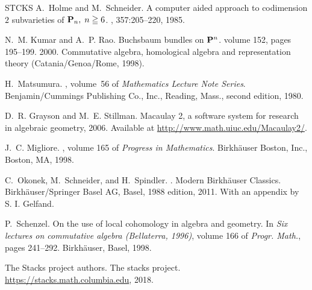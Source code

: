 \documentclass[11pt,a4paper]{amsart}
\theoremstyle{plain}
\theoremstyle{definition}
\begin{document}
\begin{thebibliography}{STCKS}
A.~Holme and M.~Schneider.
\newblock A computer aided approach to codimension {$2$} subvarieties of {${\bf
  P}_n,\;n \geqq 6$}.
, 357:205--220, 1985.

N.~M. Kumar and A.~P. Rao.
\newblock Buchsbaum bundles on {$\bold P^n$}.
\newblock volume 152, pages 195--199. 2000.
\newblock Commutative algebra, homological algebra and representation theory
  (Catania/Genoa/Rome, 1998).

H.~Matsumura.
, volume~56 of {\em Mathematics Lecture Note
  Series}.
\newblock Benjamin/Cummings Publishing Co., Inc., Reading, Mass., second
  edition, 1980.

D.~R. Grayson and M.~E. Stillman.
\newblock Macaulay 2, a software system for research in algebraic geometry,
  2006.
\newblock Available at \url{http://www.math.uiuc.edu/Macaulay2/}.

J.~C. Migliore.
, volume
  165 of {\em Progress in Mathematics}.
\newblock Birkh\"{a}user Boston, Inc., Boston, MA, 1998.

C.~Okonek, M.~Schneider, and H.~Spindler.
.
\newblock Modern Birkh\"{a}user Classics. Birkh\"{a}user/Springer Basel AG,
  Basel, 1988 edition, 2011.
\newblock With an appendix by S. I. Gelfand.

P.~Schenzel.
\newblock On the use of local cohomology in algebra and geometry.
\newblock In {\em Six lectures on commutative algebra ({B}ellaterra, 1996)},
  volume 166 of {\em Progr. Math.}, pages 241--292. Birkh\"{a}user, Basel,
  1998.

{The Stacks project authors}.
\newblock The stacks project.
\newblock \url{https://stacks.math.columbia.edu}, 2018.

\end{thebibliography}
\end{document}
